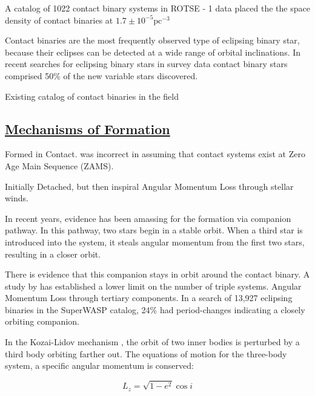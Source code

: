 \documentclass[12pt]{article} %
\numberwithin{equation}{section} %
\begin{document}
A catalog of 1022 contact binary systems in ROTSE - 1 data placed the the space density of contact binaries at $1.7 \pm 10^{-5} \text{pc}^{-3}$ \citep{gettel2006catalog}
 
Contact binaries are the most frequently observed type of eclipsing binary star, because their eclipses can be detected at a wide range of orbital inclinations. In recent searches for eclipsing binary stars in survey data \citep{drake2014catalina} contact binary stars comprised 50\% of the new variable stars discovered. 

Existing catalog of contact binaries in the field \citep{pribulla2003catalogue}


\subsection[Mechanisms of Formation]{\hyperlink{toc}{Mechanisms of Formation}}

Formed in Contact. \citet{lucy1968structure} was incorrect in assuming that contact systems exist at Zero Age Main Sequence (ZAMS).

\citep{yildiz2013origin}

\citep{bilir2005kinematics}

\citep{li2007formation}

Initially Detached, but then inspiral
Angular Momentum Loss through stellar winds. 


In recent years, evidence has been amassing for the formation via companion pathway. In this pathway, two stars begin in a stable orbit. When a third star is introduced into the system, it steals angular momentum from the first two stars, resulting in a closer orbit. 

There is evidence that this companion stays in orbit around the contact binary.
A study by \citet{pribulla2006contact} has established a lower limit on the number of triple systems. Angular Momentum Loss through tertiary components.  \citep{lohr2015orbital} In a search of 13,927 eclipsing binaries in the SuperWASP catalog, 24\% had period-changes indicating a closely orbiting companion.

In the Kozai-Lidov mechanism , the orbit of two inner bodies is perturbed by a third body orbiting farther out. The equations of motion for the three-body system, a specific angular momentum is conserved:

\begin{equation} \label{kozai_1}
L_{z} = \sqrt{1- e^{2}} \cos i
\end{equation}
\end{document}
